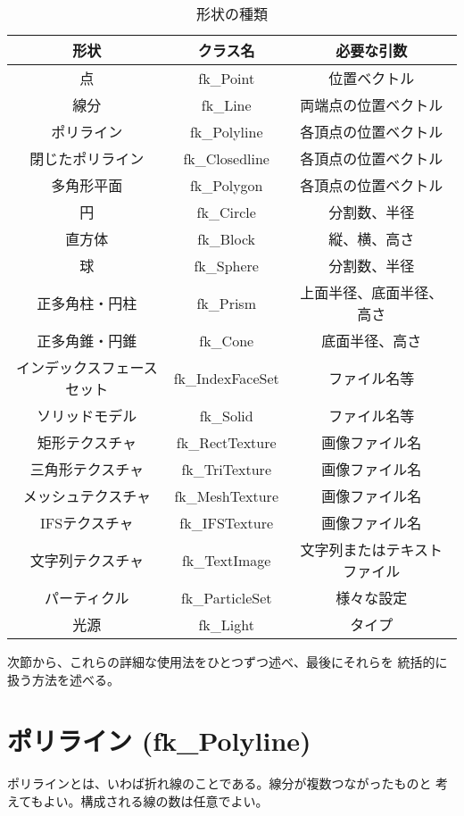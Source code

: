 \begin{table}[H]
\caption{形状の種類}
\label{tbl:fkShape1}
\begin{center}
\begin{small}
\begin{tabular}{|c|c|c|}
\hline
形状 & クラス名 & 必要な引数 \\ \hline \hline
点 & fk\_Point & 位置ベクトル \\ \hline
線分 & fk\_Line & 両端点の位置ベクトル \\ \hline
ポリライン & fk\_Polyline & 各頂点の位置ベクトル \\ \hline
閉じたポリライン & fk\_Closedline & 各頂点の位置ベクトル \\ \hline
多角形平面 & fk\_Polygon & 各頂点の位置ベクトル \\ \hline
円 & fk\_Circle & 分割数、半径 \\ \hline
直方体 & fk\_Block & 縦、横、高さ \\ \hline
球 & fk\_Sphere & 分割数、半径 \\ \hline
正多角柱・円柱 & fk\_Prism & 上面半径、底面半径、高さ \\ \hline
正多角錐・円錐 & fk\_Cone & 底面半径、高さ \\ \hline
インデックスフェースセット & fk\_IndexFaceSet & ファイル名等 \\ \hline
ソリッドモデル & fk\_Solid & ファイル名等 \\ \hline
矩形テクスチャ & fk\_RectTexture & 画像ファイル名 \\ \hline
三角形テクスチャ & fk\_TriTexture & 画像ファイル名 \\ \hline
メッシュテクスチャ & fk\_MeshTexture & 画像ファイル名 \\ \hline
IFSテクスチャ & fk\_IFSTexture & 画像ファイル名 \\ \hline
文字列テクスチャ & fk\_TextImage & 文字列またはテキストファイル \\ \hline
パーティクル & fk\_ParticleSet & 様々な設定 \\ \hline
光源 & fk\_Light & タイプ \\ \hline
\end{tabular}
\end{small}
\end{center}
\end{table}
次節から、これらの詳細な使用法をひとつずつ述べ、最後にそれらを
統括的に扱う方法を述べる。

\section{ポリライン (fk\_Polyline)}
ポリラインとは、いわば折れ線のことである。線分が複数つながったものと
考えてもよい。構成される線の数は任意でよい。

